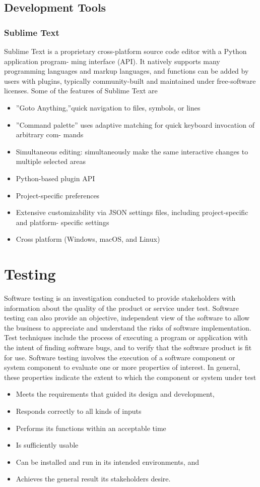 \documentclass[11pt]{report}
\begin{document}
\section{Development Tools}
\subsection{Sublime Text}
Sublime Text is a proprietary cross-platform source code editor with a Python application program-
ming interface (API). It natively supports many programming languages and markup languages,
and functions can be added by users with plugins, typically community-built and maintained under
free-software licenses.
Some of the features of Sublime Text are
\begin{itemize}
\item ”Goto Anything,”quick navigation to files, symbols, or lines
\item ”Command palette” uses adaptive matching for quick keyboard invocation of arbitrary com-
mands
\item Simultaneous editing: simultaneously make the same interactive changes to multiple selected
areas
\item Python-based plugin API
\item Project-specific preferences
\item Extensive customizability via JSON settings files, including project-specific and platform-
specific settings
\item Cross platform (Windows, macOS, and Linux)

\end{itemize}

\chapter{Testing}
Software testing is an investigation conducted to provide stakeholders with information about
the quality of the product or service under test. Software testing can also provide an objective,
independent view of the software to allow the business to appreciate and understand the risks of
software implementation. Test techniques include the process of executing a program or application
with the intent of finding software bugs, and to verify that the software product is fit for use.
Software testing involves the execution of a software component or system component to evaluate
one or more properties of interest. In general, these properties indicate the extent to which the
component or system under test
\begin{itemize}
    \item Meets the requirements that guided its design and development,
    \item Responds correctly to all kinds of inputs
    \item Performs its functions within an acceptable time
\item Is sufficiently usable
\item Can be installed and run in its intended environments, and
\item Achieves the general result its stakeholders desire.
\end{itemize}
\end{document}
